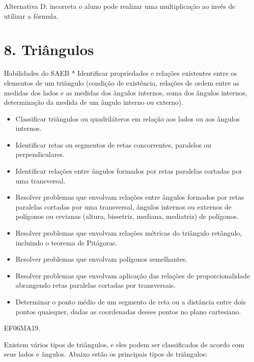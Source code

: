 Alternativa D: incorreta o aluno pode realizar uma multiplicação ao
invés de utilizar a fórmula.

\chapter{8. Triângulos}

Habilidades do SAEB * Identificar propriedades e relações existentes
entre os elementos de um triângulo (condição de existência, relações de
ordem entre as medidas dos lados e as medidas dos ângulos internos, soma
dos ângulos internos, determinação da medida de um ângulo interno ou
externo).

\begin{itemize}
\item
  Classificar triângulos ou quadriláteros em relação aos lados ou aos
  ângulos internos.
\item
  Identificar retas ou segmentos de retas concorrentes, paralelos ou
  perpendiculares.
\item
  Identificar relações entre ângulos formados por retas paralelas
  cortadas por uma transversal.
\item
  Resolver problemas que envolvam relações entre ângulos formados por
  retas paralelas cortadas por uma transversal, ângulos internos ou
  externos de polígonos ou cevianas (altura, bissetriz, mediana,
  mediatriz) de polígonos.
\item
  Resolver problemas que envolvam relações métricas do triângulo
  retângulo, incluindo o teorema de Pitágoras.
\item
  Resolver problemas que envolvam polígonos semelhantes.
\item
  Resolver problemas que envolvam aplicação das relações de
  proporcionalidade abrangendo retas paralelas cortadas por
  transversais.
\item
  Determinar o ponto médio de um segmento de reta ou a distância entre
  dois pontos quaisquer, dadas as coordenadas desses pontos no plano
  cartesiano.
\end{itemize}


\begin{itemize}
EF06MA19.
\end{itemize}

Existem vários tipos de triângulos, e eles podem ser classificados de
acordo com seus lados e ângulos. Abaixo estão os principais tipos de
triângulos:

